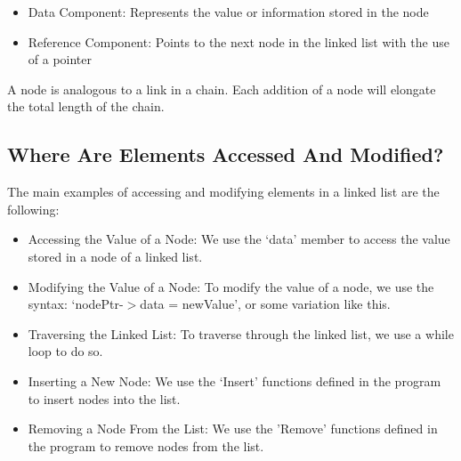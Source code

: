 \documentclass[a4paper,9pt]{article}
\begin{document}
\begin{itemize}
    \item Data Component: Represents the value or information stored in the node
    \item Reference Component: Points to the next node in the linked list with the use of a pointer
\end{itemize}

\noindent A node is analogous to a link in a chain. Each addition of a node will elongate the total length of 
the chain. 

\subsection*{Where Are Elements Accessed And Modified?}

The main examples of accessing and modifying elements in a linked list are the following:

\begin{itemize}
    \item Accessing the Value of a Node: We use the `data' member to access the value stored in a node of a 
linked list.
    \item Modifying the Value of a Node: To modify the value of a node, we use the syntax: `nodePtr-$>$data = 
newValue', or some variation like this.
    \item Traversing the Linked List: To traverse through the linked list, we use a while loop to do so.
    \item Inserting a New Node: We use the `Insert' functions defined in the program to insert nodes into the 
list.
    \item Removing a Node From the List: We use the 'Remove' functions defined in the program to remove nodes 
from the list.
\end{itemize}
\end{document}
